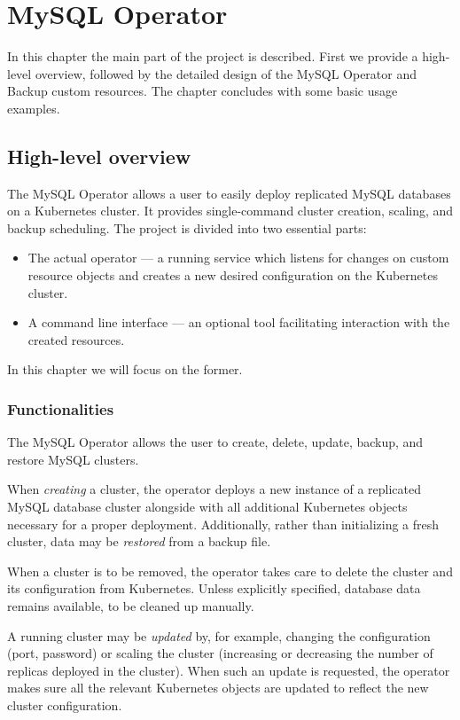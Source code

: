 \chapter{MySQL Operator}

In this chapter the main part of the project is described. First we provide 
a high-level overview, followed by the detailed design of the MySQL Operator 
and Backup custom resources. The chapter concludes with some basic usage examples.

\section{High-level overview}
The MySQL Operator allows a user to easily deploy replicated MySQL databases on a Kubernetes cluster.
It provides single-command cluster creation, scaling, and backup scheduling. The project is divided
into two essential parts:
\begin{itemize}
	\item The actual operator --- a running service which listens for changes on custom resource
	objects and creates a new desired configuration on the Kubernetes cluster.
	\item A command line interface --- an optional tool facilitating interaction with the created
	resources.
\end{itemize}

In this chapter we will focus on the former.

\subsection{Functionalities}
The MySQL Operator allows the user to create, delete, update, backup, and restore MySQL clusters.

When \textit{creating} a cluster, the operator deploys a new instance of a replicated MySQL
database cluster alongside with all additional Kubernetes objects necessary for a proper deployment.
Additionally, rather than initializing a fresh cluster, data may be \textit{restored} from a backup file.

When a cluster is to be removed, the operator takes care to delete the cluster and its
configuration from Kubernetes. Unless explicitly specified, database data remains available, to be
cleaned up manually.

A running cluster may be \textit{updated} by, for example, changing the configuration (port,
password) or scaling the cluster (increasing or decreasing the number of replicas deployed in the
cluster). When such an update is requested, the operator makes sure all the relevant Kubernetes
objects are updated to reflect the new cluster configuration.

